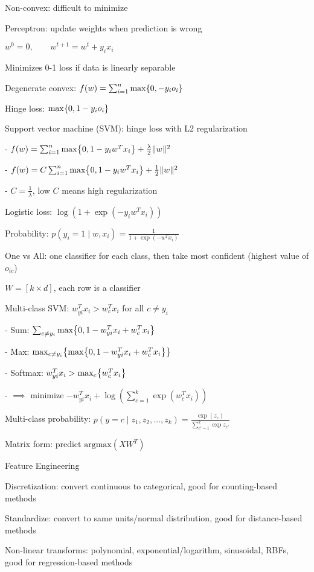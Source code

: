 \documentclass[10pt]{article}
\makeatletter
\newcommand{\tab}{\hspace{.02\textwidth}}
\newcommand{\set}[1]{\left\{#1\right\}}
\let\originalleft\left
\let\originalright\right
\renewcommand{\left}{\mathopen{}\mathclose\bgroup\originalleft}
\renewcommand{\right}{\aftergroup\egroup\originalright}
\renewcommand{\section}{\@startsection{section}{1}{0ex}{-1ex}{0.7ex}
                        {\normalfont\normalsize\bfseries}}
\newcommand{\norm}[1]{\lVert #1 \rVert}
\newcommand{\argmax}{\text{argmax}}
\makeatother
\begin{document}
\begin{multicols*}{3}
\tab Non-convex: difficult to minimize

Perceptron: update weights when prediction is wrong 

\tab $w^0=0,\qquad w^{t+1}=w^t+y_ix_i$

\tab Minimizes 0-1 loss if data is linearly separable

Degenerate convex: $f(w)=\sum_{i=1}^n\max\set{0, -y_io_i}$

Hinge loss: $\max\set{0,1-y_io_i}$

Support vector machine (SVM): hinge loss with L2 regularization

- $f(w)=\sum_{i=1}^n\max\set{0,1-y_iw^Tx_i}+\frac\lambda 2\norm w^2$

- $f(w)=C\sum_{i=1}^n\max\set{0,1-y_iw^Tx_i}+\frac 12\norm w^2$

- $C=\frac 1\lambda$, low $C$ means high regularization

Logistic loss: $\log(1+\exp(-y_iw^Tx_i))$

Probability: $p(y_i=1\mid w,x_i)=\frac{1}{1+\exp(-w^Tx_i)}$

One vs All: one classifier for each class, then take most confident (highest value of $o_{ic}$)

\tab $W=[k\times d]$, each row is a classifier

Multi-class SVM: $w_{yi}^Tx_i>w_c^Tx_i$ for all $c\ne y_i$

- Sum: $\sum_{c\ne y_i}\max\set{0,1-w_{yi}^Tx_i+w_c^Tx_i}$

- Max: $\max_{c\ne y_i}\set{\max\set{0,1-w_{yi}^Tx_i+w_c^Tx_i}}$

- Softmax: $w_{yi}^Tx_i>\max_c\set{w_c^Tx_i}$

- $\implies$ minimize $-w_{yi}^Tx_i+\log(\sum_{c=1}^k\exp(w_c^Tx_i))$

Multi-class probability: $p(y=c\mid z_1,z_2,\ldots,z_k)=\frac{\exp(z_c)}{\sum_{c'=1}^k\exp{z_{c'}}}$

Matrix form: predict $\argmax(XW^T)$

\section{Feature Engineering}

Discretization: convert continuous to categorical, good for counting-based methods

\newcolumn
Standardize: convert to same units/normal distribution, good for distance-based methods

Non-linear transforms: polynomial, exponential/logarithm, sinusoidal, RBFs, good for regression-based methods


\end{multicols*}
\end{document}
